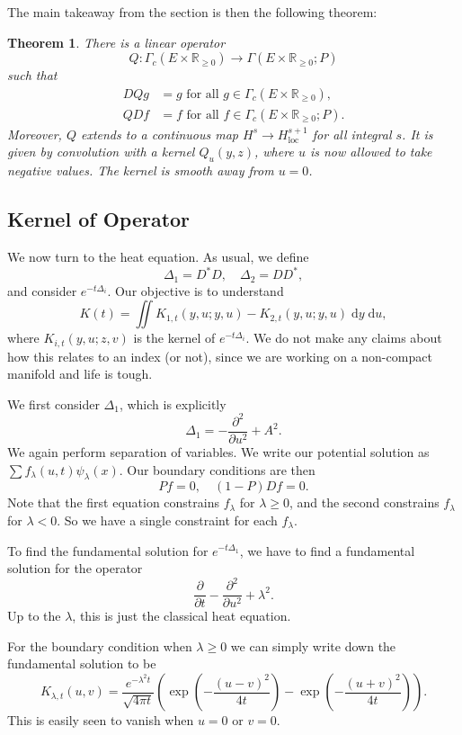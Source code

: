 \documentclass{shortart}
\newtheorem{thm}{Theorem}[section]
\theoremstyle{definition}
\newcommand\loc{\mathrm{loc}}
\newcommand\R{\mathbb{R}}
\renewcommand\d{\mathrm{d}}
\begin{document}
The main takeaway from the section is then the following theorem:
\begin{thm}
  There is a linear operator
  \[
    Q\colon \Gamma_c(E \times \R_{\geq 0}) \to \Gamma(E \times \R_{\geq 0}; P)
  \]
  such that
  \[
    \begin{aligned}
      DQg &= g\text{ for all }g \in \Gamma_c(E \times \R_{\geq 0}),\\
      QDf &= f\text{ for all }f \in \Gamma_c(E \times \R_{\geq 0}; P).
    \end{aligned}
  \]
  Moreover, $Q$ extends to a continuous map $H^s \to H^{s + 1}_{\loc}$ for all  integral $s$. It is given by convolution with a kernel $Q_u(y, z)$, where $u$ is now allowed to take negative values. The kernel is smooth away from $u = 0$.\fakeqed
\end{thm}

\subsection{Kernel of Operator}
We now turn to the heat equation. As usual, we define
\[
  \Delta_1 = D^* D,\quad \Delta_2 = D D^*,
\]
and consider $e^{-t \Delta_i}$. Our objective is to understand
\[
  K(t) = \iint K_{1, t}(y, u; y, u) - K_{2, t}(y, u; y, u) \;\d y\;\d u,
\]
where $K_{i, t}(y, u; z, v)$ is the kernel of $e^{-t \Delta_i}$. We do not make any claims about how this relates to an index (or not), since we are working on a non-compact manifold and life is tough. 

We first consider $\Delta_1$, which is explicitly
\[
  \Delta_1 = -\frac{\partial^2}{\partial u^2} + A^2.
\]
We again perform separation of variables. We write our potential solution as $\sum f_\lambda(u, t) \psi_\lambda(x)$. Our boundary conditions are then
\[
  Pf = 0,\quad (1 - P) Df = 0.
\]
Note that the first equation constrains $f_\lambda$ for $\lambda \geq 0$, and the second constrains $f_\lambda$ for $\lambda < 0$. So we have a single constraint for each $f_\lambda$.

To find the fundamental solution for $e^{- t \Delta_1}$, we have to find a fundamental solution for the operator
\[
  \frac{\partial}{\partial t} - \frac{\partial^2}{\partial u^2} + \lambda^2.
\]
Up to the $\lambda$, this is just the classical heat equation.

For the boundary condition when $\lambda \geq 0$ we can simply write down the fundamental solution to be
\[
  K_{\lambda, t}(u, v) = \frac{e^{-\lambda^2 t}}{\sqrt{4\pi t}} \left(\exp \left(-\frac{(u - v)^2}{4t}\right) - \exp\left(-\frac{(u + v)^2}{4t}\right)\right).
\]
This is easily seen to vanish when $u = 0$ or $v = 0$.
\end{document}
